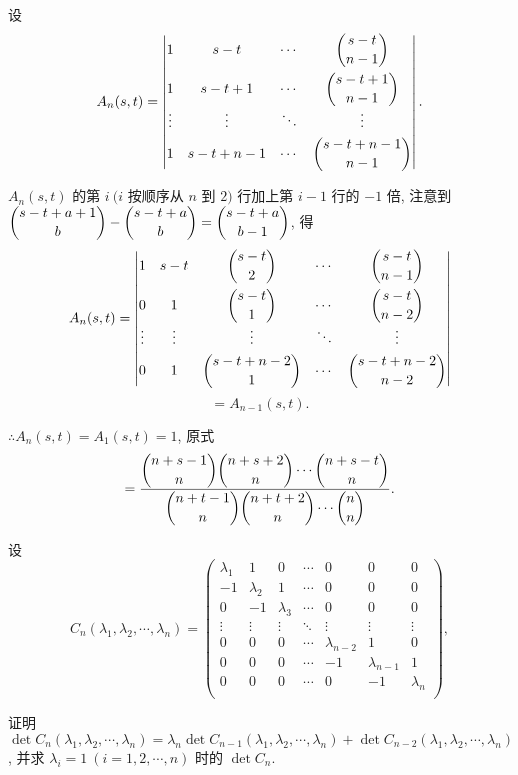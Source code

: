 \documentclass{ctexart}
\begin{document}
\begin{solution}
    设
    \[A_n(s,t)=\begin{vmatrix}
        1 & s-t & \cdots & \dbinom{s-t}{n-1} \\[10pt]
        1 & s-t+1 & \cdots & \dbinom{s-t+1}{n-1} \\
        \vdots & \vdots & \ddots & \vdots \\[4pt]
        1 & s-t+n-1 & \cdots & \dbinom{s-t+n-1}{n-1} \\
    \end{vmatrix}.\]
    
    $A_n(s,t)$ 的第 $i\ (i$ 按顺序从 $n$ 到 $2)$ 行加上第 $i-1$ 行的 $-1$ 倍, 注意到 $\dbinom{s-t+a+1}{b}-\dbinom{s-t+a}{b}=\dbinom{s-t+a}{b-1}$, 得
    \[A_n(s,t)=\begin{vmatrix}
        1 & s-t & \dbinom{s-t}{2} & \cdots & \dbinom{s-t}{n-1} \\[10pt]
        0 & 1 & \dbinom{s-t}{1} & \cdots & \dbinom{s-t}{n-2} \\
        \vdots & \vdots & \vdots & \ddots & \vdots \\[4pt]
        0 & 1 & \dbinom{s-t+n-2}{1} & \cdots & \dbinom{s-t+n-2}{n-2} \\
    \end{vmatrix}\]
    \[=A_{n-1}(s,t).\]
    
    $\therefore A_n(s,t)=A_1(s,t)=1$, 原式
    \[=\dfrac{\dbinom{n+s-1}{n}\dbinom{n+s+2}{n}\cdots\dbinom{n+s-t}{n}}{\dbinom{n+t-1}{n}\dbinom{n+t+2}{n}\cdots\dbinom{n}{n}}.\]
\end{solution}
\begin{exercise}%
    设
    \[C_n(\lambda_1,\lambda_2,\cdots,\lambda_n)=\begin{pmatrix}
        \lambda_1 & 1 & 0 & \cdots & 0 & 0 & 0 \\
        -1 & \lambda_2 & 1 & \cdots & 0 & 0 & 0 \\
        0 & -1 & \lambda_3 & \cdots & 0 & 0 & 0 \\
        \vdots & \vdots & \vdots & \ddots & \vdots & \vdots & \vdots \\
        0 & 0 & 0 & \cdots & \lambda_{n-2} & 1 & 0 \\
        0 & 0 & 0 & \cdots & -1 & \lambda_{n-1} & 1 \\
        0 & 0 & 0 & \cdots & 0 & -1 & \lambda_n \\
    \end{pmatrix},\]

    证明 $\det C_n(\lambda_1,\lambda_2,\cdots,\lambda_n)=\lambda_n\det C_{n-1}(\lambda_1,\lambda_2,\cdots,\lambda_n)+\det C_{n-2}(\lambda_1,\lambda_2,\cdots,\lambda_n)$, 并求 $\lambda_i=1\ (i=1,2,\cdots,n)$ 时的 $\det C_n$.
\end{exercise}
\end{document}
